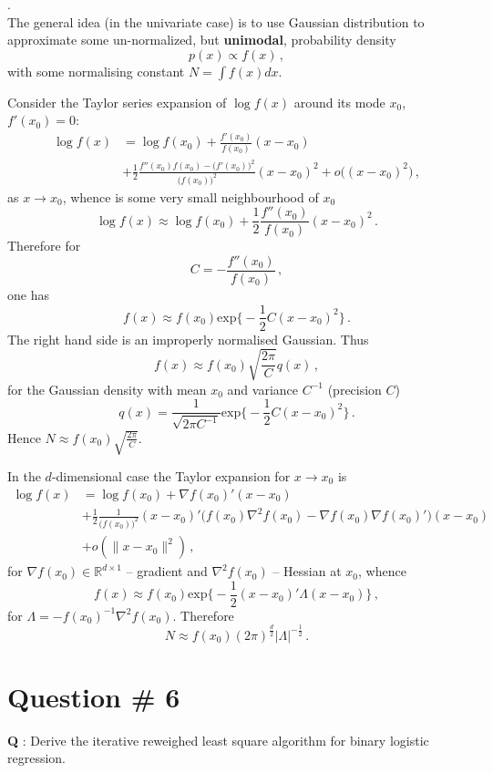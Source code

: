 \documentclass[a4paper]{article}
\newcommand{\Real}{\mathbb{R}}
\begin{document}
 .\hfill\\
The general idea (in the univariate case) is to use Gaussian distribution to approximate
some un-normalized, but \textbf{unimodal}, probability density
\[ p(x) \propto f(x) \,, \]
with some normalising constant $N = \int f(x) dx$.

Consider the Taylor series expansion of $\log f(x)$ around its mode $x_0$, $f'(x_0) = 0$:
\begin{align*}
	\log f(x)
	&= \log f(x_0) + \frac{f'(x_0)}{f(x_0)} (x-x_0)\\
	&+ \frac{1}{2} \frac{f''(x_0)f(x_0) - \bigl(f'(x_0)\bigr)^2}{\bigl(f(x_0)\bigr)^2} (x-x_0)^2
		+ o\bigl((x-x_0)^2\bigr)\,,
\end{align*}
as $x\to x_0$, whence is some very small neighbourhood of $x_0$
\[
\log f(x) \approx \log f(x_0) + \frac{1}{2} \frac{f''(x_0)}{f(x_0)} (x-x_0)^2\,.
\]
Therefore for 
\[ C = - \frac{f''(x_0)}{f(x_0)}\,, \]
one has 
\[ f(x) \approx f(x_0) \text{exp}\bigl\{ - \frac{1}{2} C (x-x_0)^2 \bigr\} \,. \]
The right hand side is an improperly normalised Gaussian. Thus
\[ f(x) \approx f(x_0) \sqrt{\frac{2\pi}{C}} q(x) \,, \]
for the Gaussian density with mean $x_0$ and variance $C^{-1}$ (precision $C$)
\[
q(x) = \frac{1}{\sqrt{2\pi C^{-1}}} \text{exp}\bigl\{ - \frac{1}{2} C (x-x_0)^2 \bigr\}\,.
\]
Hence $N \approx f(x_0) \sqrt{\frac{2\pi}{C}}$.

In the $d$-dimensional case the Taylor expansion for $x\to x_0$ is
\begin{align*}
\log f(x) &= \log f(x_0) + \nabla f(x_0)' (x-x_0) \\
	&+ \frac{1}{2} \frac{1}{\bigl(f(x_0)\bigr)^2} (x-x_0)'
		\bigl( f(x_0) \nabla^2 f(x_0) - \nabla f(x_0) \nabla f(x_0)' \bigr) (x-x_0) \\
	&+ o(\|x-x_0\|^2) \,,
\end{align*}
for $\nabla f(x_0)\in \Real^{d\times1}$ -- gradient and $\nabla^2 f(x_0)$ -- Hessian
at $x_0$, whence 
\[
f(x) \approx f(x_0) \text{exp}\biggl\{ - \frac{1}{2} (x-x_0)' \Lambda (x-x_0) \biggr\}\,,
\]
for $\Lambda = - f(x_0)^{-1} \nabla^2 f(x_0)$. Therefore
\[
N \approx f(x_0) (2\pi)^{\frac{d}{2}} |\Lambda|^{-\frac{1}{2}} \,.
\]

\clearpage

\section[Binary Logit]{Question \# 6} %
\label{sec:question_6}
\textbf{\large \textbf{Q}} : Derive the iterative reweighed least square algorithm for
binary logistic regression.
\end{document}
